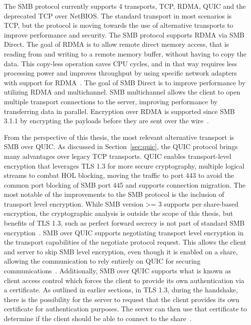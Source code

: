 \documentclass[english, 12pt, a4paper, elec, utf8, a-2b, online]{aaltothesis}
\begin{document}
The SMB protocol currently supports 4 transports, TCP, RDMA, QUIC and the
deprecated TCP over NetBIOS. The standard transport in most scenarios is TCP,
but the protocol is moving towards the use of alternative transports to improve
performance and security. The SMB protocol supports RDMA via SMB Direct. The goal
of RDMA is to allow remote direct memory access, that is reading from and writing
to a remote memory buffer, without having to copy the data. This copy-less operation saves CPU
cycles, and in that way requires less processing power and improves throughput
by using specific network adapters with support for RDMA~\cite{rfc5040}.
The goal of SMB Direct is to improve performance by utilizing RDMA
and multichannel. SMB multichannel allows the client to open multiple transport connections
to the server, improving performance by transferring data in parallel. Encryption over
RDMA is supported since SMB 3.1.1 by encrypting the payloads before they are sent over the
wire~\cite{smb_direct}.

From the perspective of this thesis, the most relevant alternative transport is
SMB over QUIC. As discussed in Section~\ref{sec:quic}, the QUIC protocol brings
many advantages over legacy TCP transports. QUIC enables transport-level encryption
that leverages TLS 1.3 for more secure cryptography, multiple logical streams
to combat HOL blocking, moving the traffic to port 443 to avoid the common port
blocking of SMB port 445 and supports connection migration. The most notable of the improvements to the
SMB protocol is the inclusion of transport level encryption. While SMB version >= 3
supports per share-based encryption, the cryptographic analysis is outside the scope
of this thesis, but benefits of TLS 1.3, such as perfect forward secrecy is not
part of standard SMB encryption~\cite{smb_quic}. SMB over QUIC supports negotiating
transport level encryption in the transport capabilities of the negotiate protocol
request. This allows the client and server to skip SMB level encryption, even though
it is enabled on a share, allowing the communication to rely entirely on QUIC for
securing communications~\cite{smb2_tech}. Additionally, SMB over QUIC supports what is
known as client access control which forces the client to provide its own authentication
via a certificate. As outlined in earlier sections, in TLS 1.3,
during the handshake,  there is the possibility for the server to request that the client
provides its own certificate for authentication purposes. The server can then use
that certificate to determine if the client should be able to connect to the share~\cite{smb_quic_cac}.
\end{document}
